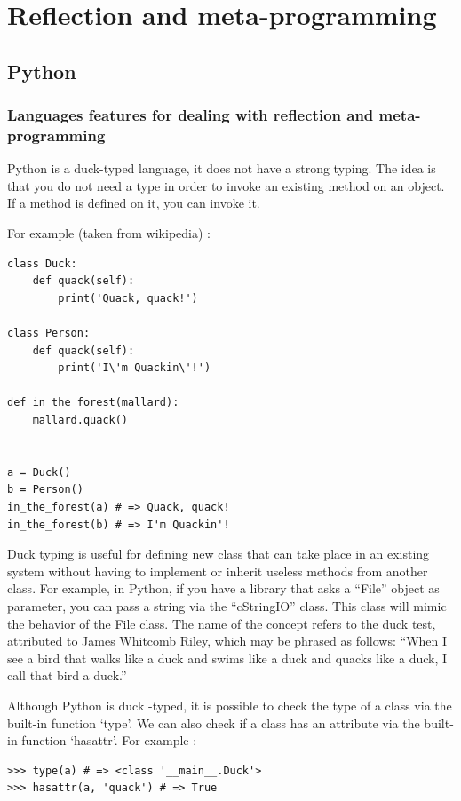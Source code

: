 \documentclass[a4paper,10pt]{article}
\begin{document}
\section{Reflection and meta-programming}

\subsection{Python}
\setpy{}
\subsubsection{Languages features for dealing with reflection and meta-programming}
\setpy{}
Python is a duck-typed language, it does not have a strong typing. The idea is that you do not need a type in order to invoke an existing method on an object. If a method is defined on it, you can invoke it.

For example (taken from wikipedia) :

\begin{lstlisting}
class Duck:
    def quack(self):
        print('Quack, quack!')

class Person:
    def quack(self):
        print('I\'m Quackin\'!')

def in_the_forest(mallard):
    mallard.quack()


a = Duck()
b = Person()
in_the_forest(a) # => Quack, quack!
in_the_forest(b) # => I'm Quackin'!
\end{lstlisting}

Duck typing is useful for defining new class that can take place in an existing system without having to implement or inherit useless methods from another class. For example, in Python, if you have a library that asks a “File” object as parameter, you can pass a string via the  “cStringIO” class. This class will mimic the behavior of the File class. The name of the concept refers to the duck test, attributed to James Whitcomb Riley, which may be phrased as follows: “When I see a bird that walks like a duck and swims like a duck and quacks like a duck, I call that bird a duck.”

Although Python is duck -typed, it is possible to check the type of a class via the built-in function ‘type’. We can also check if a class has an attribute via the built-in function ‘hasattr’. For example :

\begin{lstlisting}
>>> type(a) # => <class '__main__.Duck'>
>>> hasattr(a, 'quack') # => True
\end{lstlisting}
\end{document}
